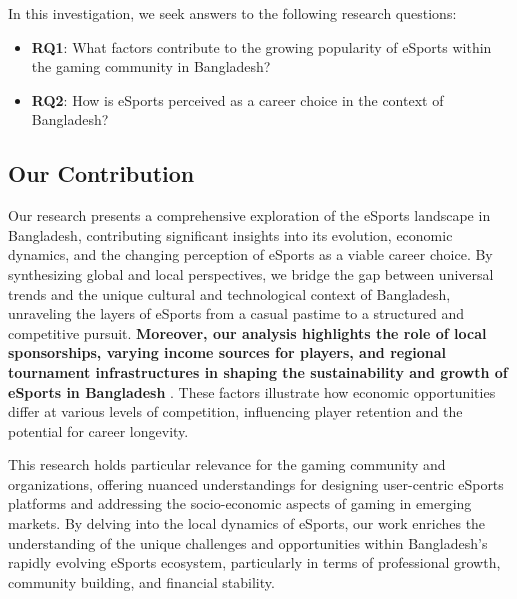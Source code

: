\documentclass[manuscript,screen,review,anonymous]{acmart}
\begin{document}
In this investigation, we seek answers to the following research questions:

\begin{itemize}

\item \textbf{RQ1}: What factors contribute to the growing popularity of eSports within the gaming community in Bangladesh?

\item \textbf{RQ2}: How is eSports perceived as a career choice in the context of Bangladesh?


\end{itemize}

\subsection{Our Contribution}

Our research presents a comprehensive exploration of the eSports landscape in Bangladesh, contributing significant insights into its evolution, economic dynamics, and the changing perception of eSports as a viable career choice. By synthesizing global and local perspectives, we bridge the gap between universal trends and the unique cultural and technological context of Bangladesh, unraveling the layers of eSports from a casual pastime to a structured and competitive pursuit. \textbf{Moreover, our analysis highlights the role of local sponsorships, varying income sources for players, and regional tournament infrastructures in shaping the sustainability and growth of eSports in Bangladesh} \cite{Funk2017eSport}. These factors illustrate how economic opportunities differ at various levels of competition, influencing player retention and the potential for career longevity.

This research holds particular relevance for the gaming community and organizations, offering nuanced understandings for designing user-centric eSports platforms and addressing the socio-economic aspects of gaming in emerging markets. By delving into the local dynamics of eSports, our work enriches the understanding of the unique challenges and opportunities within Bangladesh’s rapidly evolving eSports ecosystem, particularly in terms of professional growth, community building, and financial stability.

\end{document}
